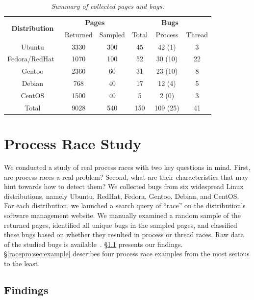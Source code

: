 \begin{table}[t]
\centering
\begin{tabular}{@{}c@{}|cc|ccc@{}}
  \multirow{2}{*}{\bf Distribution} & 
    \multicolumn{2}{c|}{\bf Pages} &
    \multicolumn{3}{c}{\bf Bugs} \\
  & Returned & Sampled
    & Total
    & Process
    & Thread \\
  \hline
  Ubuntu              & 3330 & 300  & 45  & 42 (1)   & 3   \\
  Fedora/RedHat\,\,\, & 1070 & 100  & 52  & 30 (10)  & 22  \\
  Gentoo              & 2360 & 60   & 31  & 23 (10)  & 8   \\
  Debian              & 768  & 40   & 17  & 12 (4)   & 5   \\
  CentOS              & 1500 & 40   & 5   & 2 (0)    & 3   \\
  \hline                           
  Total               & 9028 & 540  & 150 & 109 (25) & 41  \\
\end{tabular}
\caption{{\em Summary of collected pages and bugs.}} \label{racepro:tab:data}
\end{table}


\section{Process Race Study} \label{racepro:sec:study}

We conducted a study of real process races with two key questions in
mind.  First, are process races a real problem?  Second, what are their
characteristics that may hint towards how to detect them?  We
collected bugs from six widespread Linux distributions, namely 
Ubuntu, RedHat, Fedora, Gentoo, Debian, and CentOS.  For each
distribution, we launched a search query of ``race'' on the distribution's
software management website.  We manually examined a random sample of
the returned pages, identified all unique bugs in the sampled pages,
and classified these bugs based on whether they resulted in process
or thread races.  Raw data of the studied bugs is 
available~\cite{all-resource-races}.
\S\ref{racepro:sec:findings} presents our findings. \S\ref{racepro:sec:example}
describes four process race examples from the most serious to the
least. 

\subsection{Findings} \label{racepro:sec:findings}

